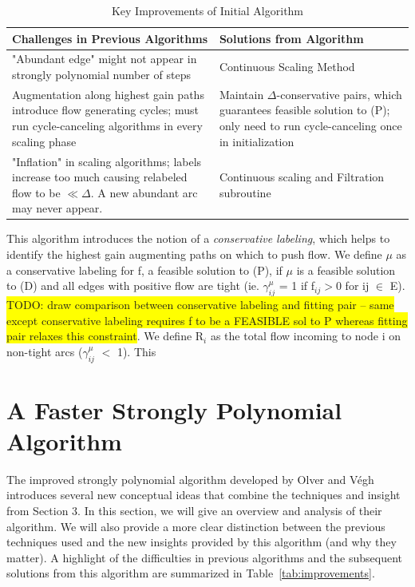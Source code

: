 \documentclass[12pt]{article}
\theoremstyle{definition}
\newcommand{\gij}{\gamma_{ij}}
\newcommand{\gie}{\gij^{\mu}}
\newcommand{\todo}[1]{\colorbox{yellow}{TODO: #1}}
\begin{document}
\begin{table}[H]
\begin{center}
    \begin{tabular}{ | p{7cm} | p{7cm} |}
    \hline
    Challenges in Previous Algorithms  & Solutions from Algorithm \\ \hline
    "Abundant edge" might not appear in strongly polynomial number of steps \cite{Radzik2004} & Continuous Scaling Method  \\ \hline
    Augmentation along highest gain paths introduce flow generating cycles; must run cycle-canceling algorithms in every scaling phase & Maintain $\Delta$-conservative pairs, which guarantees feasible solution to (P); only need to run cycle-canceling once in initialization  \\ \hline
    "Inflation" in scaling algorithms; labels increase too much causing relabeled flow to be $\ll \Delta$. A new abundant arc may never appear. & Continuous scaling and Filtration subroutine \\
    \hline
    \end{tabular}
\end{center}
\caption{Key Improvements of Initial Algorithm}
\label{tab:improvementsInitial}
\end{table}
This algorithm introduces the notion of a \textit{conservative labeling}, which helps to identify the highest gain augmenting paths on which to push flow. We define $\mu$ as a conservative labeling for f, a feasible solution to (P), if $\mu$ is a feasible solution to (D) and all edges with positive flow are tight (ie. $\gie$ = 1 if f$_{ij} > 0$ for ij $\in$ E). \todo{draw comparison between conservative labeling and fitting pair -- same except conservative labeling requires f to be a FEASIBLE sol to P whereas fitting pair relaxes this constraint}. We define R$_i$ as the total flow incoming to node i on non-tight arcs ($\gie$ $<$ 1). This


\section{A Faster Strongly Polynomial Algorithm} The improved strongly polynomial algorithm developed by Olver and Végh \cite{Olver2017} introduces several new conceptual ideas that combine the techniques and insight from Section 3. In this section, we will give an overview and analysis of their algorithm. We will also provide a more clear distinction between the previous techniques used and the new insights provided by this algorithm (and why they matter). A highlight of the difficulties in previous algorithms and the subsequent solutions from this algorithm are summarized in Table~\ref{tab:improvements}.
\end{document}
